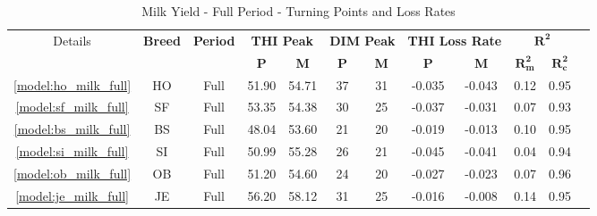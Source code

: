 \begin{table}[htbp]
    \centering
    \begin{tabular}{c c c c c c c c c c c c}
        \toprule
        \multirow{2}{*}{Details} &
        \multirow{2}{*}{\textbf{Breed}} &
        \multirow{2}{*}{\textbf{Period}} &
        \multicolumn{2}{c}{\textbf{THI Peak}} &
        \multicolumn{2}{c}{\textbf{DIM Peak}} &
        \multicolumn{2}{c}{\textbf{THI Loss Rate}} &
        \multicolumn{2}{c}{$\mathbf{R^2}$} \\
        \cmidrule(lr){4-5} \cmidrule(lr){6-7} \cmidrule(lr){8-9} \cmidrule(lr){10-11}
        & & &
        \textbf{P} & \textbf{M} &
        \textbf{P} & \textbf{M} &
        \textbf{P} & \textbf{M} &
        $\mathbf{R^2_m}$ & $\mathbf{R^2_c}$ & \\
        \hline
        \hline
        \textcolor{blue}{\ref{model:ho_milk_full}}& HO & Full & 51.90 & 54.71 & 37 & 31 & -0.035 & -0.043 & 0.12 & 0.95\\
        \textcolor{blue}{\ref{model:sf_milk_full}}& SF & Full & 53.35 & 54.38 & 30 & 25 & -0.037 & -0.031 & 0.07 & 0.93\\
        \textcolor{blue}{\ref{model:bs_milk_full}}& BS & Full & 48.04 & 53.60 & 21 & 20 & -0.019 & -0.013 & 0.10 & 0.95\\
        \textcolor{blue}{\ref{model:si_milk_full}}& SI & Full & 50.99 & 55.28 & 26 & 21 & -0.045 & -0.041 & 0.04 & 0.94\\
        \textcolor{blue}{\ref{model:ob_milk_full}}& OB & Full & 51.20 & 54.60 & 24 & 20 & -0.027 & -0.023 & 0.07 & 0.96\\
        \textcolor{blue}{\ref{model:je_milk_full}}& JE & Full & 56.20 & 58.12 & 31 & 25 & -0.016 & -0.008 & 0.14 & 0.95\\
        \bottomrule
    \end{tabular}
    \caption{Milk Yield - Full Period - Turning Points and Loss Rates}
    \label{table:milk_yield_full_period}
\end{table}

